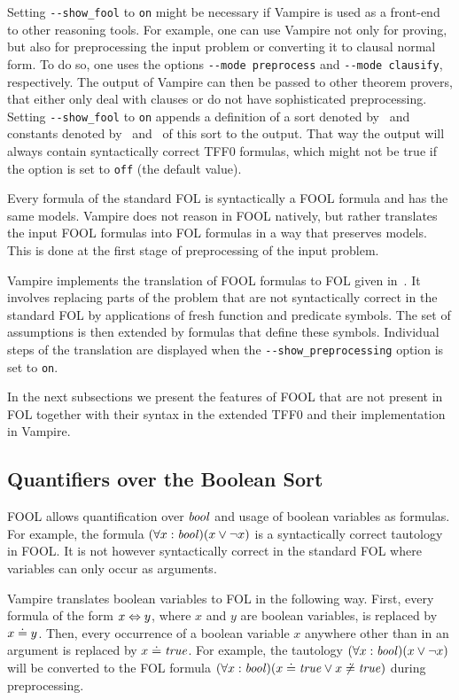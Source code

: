 Setting \verb'--show_fool' to \verb'on' might be necessary if Vampire is used as a front-end to other reasoning tools. For example, one can use Vampire not only for proving, but also for preprocessing the input problem or converting it to clausal normal form. To do so, one uses the options \verb|--mode preprocess| and \verb|--mode clausify|, respectively. The output of Vampire can then be passed to other theorem provers, that either only deal with clauses or do not have sophisticated preprocessing. Setting \verb'--show_fool' to \verb'on' appends a definition of a sort denoted by \dbool\ and constants denoted by \ddtrue\ and \ddfalse\ of this sort to the output. That way the output will always contain syntactically correct TFF0 formulas, which might not be true if the option is set to \verb'off' (the default value).

Every formula of the standard FOL is syntactically a FOOL formula and has the same models. Vampire does not reason in FOOL natively, but rather translates the input FOOL formulas into FOL formulas in a way that preserves models. This is done at the first stage of preprocessing of the input problem.

Vampire implements the translation of FOOL formulas to FOL given in~\cite{FOOL}. It involves replacing parts of the problem that are not syntactically correct in the standard FOL by applications of fresh function and predicate symbols. The set of assumptions is then extended by formulas that define these symbols. Individual steps of the translation are displayed when the \verb'--show_preprocessing' option is set to \verb'on'.

In the next subsections we present the features of FOOL that are not present in FOL together with their syntax in the extended TFF0 and their implementation in Vampire.

\subsection{Quantifiers over the Boolean Sort}

FOOL allows quantification over $\mathit{bool}$ and usage of boolean variables as formulas. For example, the formula $(\forall x:\mathit{bool})(x \lor \neg x)$ is a syntactically correct tautology in FOOL. It is not however syntactically correct in the standard FOL where variables can only occur as arguments.

Vampire translates boolean variables to FOL in the following way. First, every formula of the form $x \Leftrightarrow y$, where $x$ and $y$ are boolean variables, is replaced by $x \doteq y$. Then, every occurrence of a boolean variable $x$ anywhere other than in an argument is replaced by $x \doteq \mathit{true}$. For example, the tautology $(\forall x:\mathit{bool})(x \lor \neg x)$ will be converted to the FOL formula $(\forall x:\mathit{bool})(x \doteq \mathit{true} \lor x \not\doteq \mathit{true})$ during preprocessing.

